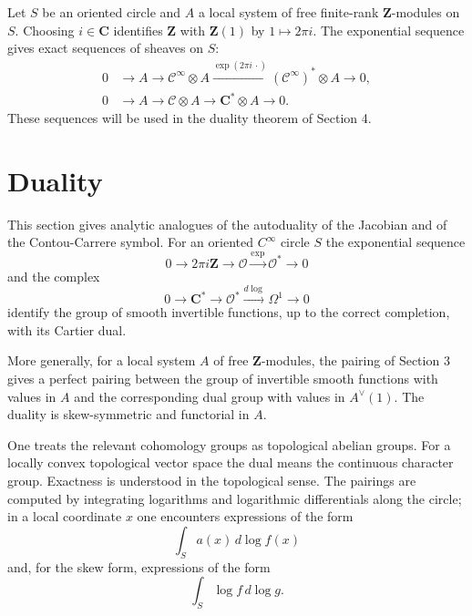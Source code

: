 \documentclass[11pt]{article}
\theoremstyle{remark}
\newcommand{\C}{\mathbf C}
\newcommand{\Z}{\mathbf Z}
\newcommand{\OO}{\mathcal O}
\newcommand{\CC}{\mathcal C}
\begin{document}
Let $S$ be an oriented circle and $A$ a local system of free finite-rank $\Z$-modules on $S$. Choosing $i\in\C$ identifies $\Z$ with $\Z(1)$ by $1\mapsto 2\pi i$. The exponential sequence gives exact sequences of sheaves on $S$:
\begin{align}\tag{3.13.1}
 0&\longrightarrow A\longrightarrow \CC^\infty\otimes A\xrightarrow{\exp(2\pi i\,\cdot)}(\CC^\infty)^*\otimes A\longrightarrow0,\\
 0&\longrightarrow A\longrightarrow \CC\otimes A\longrightarrow \C^*\otimes A\longrightarrow0.
\end{align}
These sequences will be used in the duality theorem of Section 4.

\section{Duality}

This section gives analytic analogues of the autoduality of the Jacobian and of the Contou-Carrere symbol. For an oriented $C^\infty$ circle $S$ the exponential sequence
\begin{equation}\tag{4.1.1}
 0\longrightarrow 2\pi i\Z\longrightarrow\OO\xrightarrow{\exp}\OO^*\longrightarrow0
\end{equation}
and the complex
\begin{equation}\tag{4.1.2}
 0\longrightarrow\C^*\longrightarrow\OO^*\xrightarrow{d\log}\Omega^1\longrightarrow0
\end{equation}
identify the group of smooth invertible functions, up to the correct completion, with its Cartier dual.

More generally, for a local system $A$ of free $\Z$-modules, the pairing of Section 3 gives a perfect pairing between the group of invertible smooth functions with values in $A$ and the corresponding dual group with values in $A^\vee(1)$. The duality is skew-symmetric and functorial in $A$.

One treats the relevant cohomology groups as topological abelian groups. For a locally convex topological vector space the dual means the continuous character group. Exactness is understood in the topological sense. The pairings are computed by integrating logarithms and logarithmic differentials along the circle; in a local coordinate $x$ one encounters expressions of the form
\begin{equation}\tag{4.6.1}
 \int_S a(x)\,d\log f(x)
\end{equation}
and, for the skew form, expressions of the form
\begin{equation}\tag{4.6.2}
 \int_S \log f\,d\log g.
\end{equation}
\end{document}
